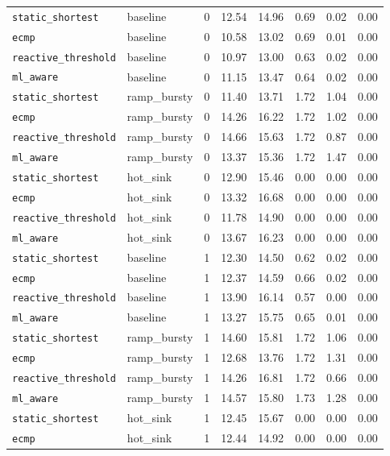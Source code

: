 \begin{longtable}{llcrrrrr}
\texttt{static\_shortest} & baseline & 0 & 12.54 & 14.96 & 0.69 & 0.02 & 0.00 \\
\texttt{ecmp} & baseline & 0 & 10.58 & 13.02 & 0.69 & 0.01 & 0.00 \\
\texttt{reactive\_threshold} & baseline & 0 & 10.97 & 13.00 & 0.63 & 0.02 & 0.00 \\
\texttt{ml\_aware} & baseline & 0 & 11.15 & 13.47 & 0.64 & 0.02 & 0.00 \\
\texttt{static\_shortest} & ramp\_bursty & 0 & 11.40 & 13.71 & 1.72 & 1.04 & 0.00 \\
\texttt{ecmp} & ramp\_bursty & 0 & 14.26 & 16.22 & 1.72 & 1.02 & 0.00 \\
\texttt{reactive\_threshold} & ramp\_bursty & 0 & 14.66 & 15.63 & 1.72 & 0.87 & 0.00 \\
\texttt{ml\_aware} & ramp\_bursty & 0 & 13.37 & 15.36 & 1.72 & 1.47 & 0.00 \\
\texttt{static\_shortest} & hot\_sink & 0 & 12.90 & 15.46 & 0.00 & 0.00 & 0.00 \\
\texttt{ecmp} & hot\_sink & 0 & 13.32 & 16.68 & 0.00 & 0.00 & 0.00 \\
\texttt{reactive\_threshold} & hot\_sink & 0 & 11.78 & 14.90 & 0.00 & 0.00 & 0.00 \\
\texttt{ml\_aware} & hot\_sink & 0 & 13.67 & 16.23 & 0.00 & 0.00 & 0.00 \\
\midrule
\texttt{static\_shortest} & baseline & 1 & 12.30 & 14.50 & 0.62 & 0.02 & 0.00 \\
\texttt{ecmp} & baseline & 1 & 12.37 & 14.59 & 0.66 & 0.02 & 0.00 \\
\texttt{reactive\_threshold} & baseline & 1 & 13.90 & 16.14 & 0.57 & 0.00 & 0.00 \\
\texttt{ml\_aware} & baseline & 1 & 13.27 & 15.75 & 0.65 & 0.01 & 0.00 \\
\texttt{static\_shortest} & ramp\_bursty & 1 & 14.60 & 15.81 & 1.72 & 1.06 & 0.00 \\
\texttt{ecmp} & ramp\_bursty & 1 & 12.68 & 13.76 & 1.72 & 1.31 & 0.00 \\
\texttt{reactive\_threshold} & ramp\_bursty & 1 & 14.26 & 16.81 & 1.72 & 0.66 & 0.00 \\
\texttt{ml\_aware} & ramp\_bursty & 1 & 14.57 & 15.80 & 1.73 & 1.28 & 0.00 \\
\texttt{static\_shortest} & hot\_sink & 1 & 12.45 & 15.67 & 0.00 & 0.00 & 0.00 \\
\texttt{ecmp} & hot\_sink & 1 & 12.44 & 14.92 & 0.00 & 0.00 & 0.00 \\

\end{longtable}
